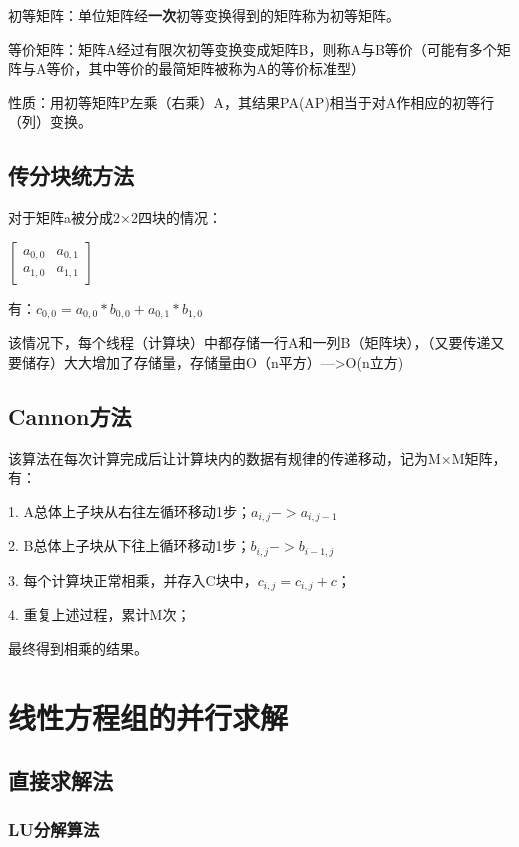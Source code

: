 \documentclass[UTF8]{article}%
\begin{document}
初等矩阵：单位矩阵经\textbf{一次}初等变换得到的矩阵称为初等矩阵。

等价矩阵：矩阵A经过有限次初等变换变成矩阵B，则称A与B等价（可能有多个矩阵与A等价，其中等价的最简矩阵被称为A的等价标准型）

性质：用初等矩阵P左乘（右乘）A，其结果PA(AP)相当于对A作相应的初等行（列）变换。

\subsection{传分块统方法}

对于矩阵a被分成2×2四块的情况：

$
\begin{bmatrix}
    a_{0,0} & a_{0,1}  \\
    a_{1,0} & a_{1,1}
\end{bmatrix}
$

有：$c_{0,0}=a_{0,0}*b_{0,0}+a_{0,1}*b_{1,0}$

该情况下，每个线程（计算块）中都存储一行A和一列B（矩阵块），（又要传递又要储存）大大增加了存储量，存储量由O（n平方）—>O(n立方)

\subsection{Cannon方法}

该算法在每次计算完成后让计算块内的数据有规律的传递移动，记为M×M矩阵，有：

1. A总体上子块从右往左循环移动1步；$a_{i,j}->a_{i,j-1}$

2. B总体上子块从下往上循环移动1步；$b_{i,j}->b_{i-1,j}$

3. 每个计算块正常相乘，并存入C块中，$c_{i,j}=c_{i,j}+c$；

4. 重复上述过程，累计M次；

最终得到相乘的结果。

\section{线性方程组的并行求解}

\subsection{直接求解法}

\subsubsection{LU分解算法}
\end{document}

